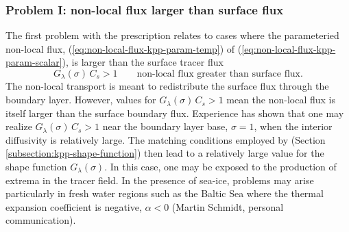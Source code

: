 \subsubsection{Problem I: non-local flux larger than surface flux}

The first problem with the \cite{LargeKPP} prescription relates to
cases where the parameteried non-local flux,
(\ref{eq:non-local-flux-kpp-param-temp}) of
(\ref{eq:non-local-flux-kpp-param-scalar}), is larger than the surface
tracer flux
\begin{equation}
   G_{\lambda}(\sigma) \, C_{s} > 1\qquad \mbox{non-local flux greater than surface flux.}
\end{equation}
The non-local transport is meant to redistribute the surface flux
through the boundary layer.  However, values for $G_{\lambda}(\sigma)
\, C_{s} > 1$ mean the non-local flux is itself larger than the
surface boundary flux.  Experience has shown that one may realize
$G_{\lambda}(\sigma) \, C_{s} > 1$ near the boundary layer base,
$\sigma=1$, when the interior diffusivity is relatively large.  The
matching conditions employed by \cite{LargeKPP} (Section
\ref{subsection:kpp-shape-function}) then lead to a relatively large
value for the shape function $G_{\lambda}(\sigma)$.  In this case, one
may be exposed to the production of extrema in the tracer field.  In
the presence of sea-ice, problems may arise particularly in fresh
water regions such as the Baltic Sea where the thermal expansion
coefficient is negative, $\alpha < 0$ (Martin Schmidt, personal
communication).

